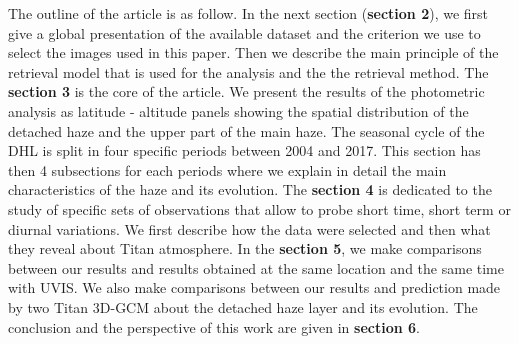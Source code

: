 The outline of the article is as follow. In the next section (\textbf{section 2}), we first give a global presentation of
the available dataset and the criterion we use to select the images used in this paper.
Then we describe the main principle of the retrieval model that is used for the analysis and the the retrieval method.
The \textbf{section 3} is the core of the article. We present the results of the photometric analysis as latitude -
altitude panels showing the spatial distribution of the detached haze and the upper part of the main haze.
The seasonal cycle of the DHL is split in four specific periods between 2004 and 2017.
This section has then 4 subsections for each periods where we explain in detail the main characteristics of the haze and
its evolution.
The \textbf{section 4} is dedicated to the study of specific sets of observations that allow to probe short time,
short term or diurnal variations. We first describe how the data were selected and then what they reveal about Titan atmosphere.
In the \textbf{section 5}, we make comparisons between our results and results obtained at the same location and the same time with UVIS.
We also make comparisons between our results and prediction made by two Titan 3D-GCM about the detached haze layer and its evolution.
The conclusion and the perspective of this work are given in \textbf{section 6}.

